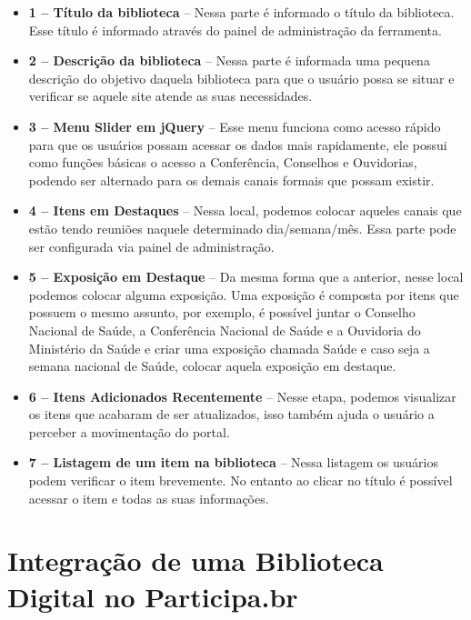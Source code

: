 \begin{itemize}
\item \textbf{1 – Título da biblioteca} – Nessa parte é informado o título da biblioteca. Esse título é informado através do painel de administração da ferramenta.
\item \textbf{2 – Descrição da biblioteca} – Nessa parte é informada uma pequena descrição do objetivo daquela biblioteca para que o usuário possa se situar e verificar se aquele site atende as suas necessidades.
\item \textbf{3 – Menu Slider em jQuery} – Esse menu funciona como acesso rápido para que os usuários possam acessar os dados mais rapidamente, ele possui como funções básicas o acesso a Conferência, Conselhos e Ouvidorias, podendo ser alternado para os demais canais formais que possam existir.
\item \textbf{4 – Itens em Destaques} – Nessa local, podemos colocar aqueles canais que estão tendo reuniões naquele determinado dia/semana/mês. Essa parte pode ser configurada via painel de administração.
\item \textbf{5 – Exposição em Destaque} – Da mesma forma que a anterior, nesse local podemos colocar alguma exposição. Uma exposição é composta por itens que possuem o mesmo assunto, por exemplo, é possível juntar o Conselho Nacional de Saúde, a Conferência Nacional de Saúde e a Ouvidoria do Ministério da Saúde e criar uma exposição chamada Saúde e caso seja a semana nacional de Saúde, colocar aquela exposição em destaque.
\item \textbf{6 – Itens Adicionados Recentemente} – Nesse etapa, podemos visualizar os itens que acabaram de ser atualizados, isso também ajuda o usuário a perceber a movimentação do portal.
\item \textbf{7 – Listagem de um item na biblioteca} – Nessa listagem os usuários podem verificar o item brevemente. No entanto ao clicar no título é possível acessar o item e todas as suas informações.
\end{itemize}

\section{Integração de uma Biblioteca Digital no Participa.br}



